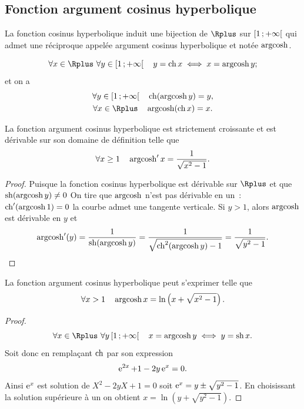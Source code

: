 \subsection{Fonction argument cosinus hyperbolique}
\label{subsec:chap1-fonctionargcosh}
\begin{defdef}
  La fonction cosinus hyperbolique induit une bijection de $\Rplus$ sur $\left[ 1 \, ;  +\infty \right[$ qui admet une réciproque appelée argument cosinus hyperbolique et notée $\operatorname{argcosh}$.
\end{defdef}
%
\begin{prop}
  \begin{equation} 
    \forall x \in \Rplus \ \forall y \in \intervallefo{1}{+\infty} \quad y=\hcos x \iff x = \argch y ;
  \end{equation}
  et on a
  \begin{gather}
    \forall y \in \intervallefo{1}{+\infty} \quad \hcos(\argch y) = y, \\
    \forall x \in \Rplus \quad \argch(\hcos x) = x.
  \end{gather}
\end{prop}
%
\begin{prop} 
  La fonction argument cosinus hyperbolique est strictement croissante et est dérivable sur son domaine de définition telle que 
  \begin{equation} 
    \forall x\geq{}1 \quad \operatorname{argcosh}' x =\frac{1}{\sqrt{x^2-1}}.
  \end{equation} 
\end{prop}
\begin{proof} 
  Puisque la fonction cosinus hyperbolique est dérivable sur $\Rplus$ et que $\operatorname{sh}(\operatorname{argcosh} y) \neq 0$ On tire que $\operatorname{argcosh}$ n'est pas dérivable en un~: $\operatorname{ch}'(\operatorname{argcosh} 1)=0$ la courbe admet une tangente verticale. Si $y>1$, alors $\operatorname{argcosh}$ est dérivable en $y$ et 
  \begin{equation} 
    \operatorname{argcosh}'(y)=\frac{1}{\operatorname{sh}(\operatorname{argcosh} y)}=\frac{1}{\sqrt{\operatorname{ch}^2(\operatorname{argcosh} y)-1}}=\frac{1}{\sqrt{y^2-1}}.
  \end{equation} 
\end{proof}
%
\begin{prop} La fonction argument cosinus hyperbolique peut s'exprimer telle que
  \begin{equation} 
    \forall x>1 \quad \operatorname{argcosh} x = \ln \left(x +\sqrt{x^2-1}\right).
  \end{equation}
\end{prop} 
\begin{proof} 
  \begin{equation}
    \forall x \in \Rplus \ \forall y \intervallefo{1}{+\infty} \quad x=\argch y \iff y=\hsin x.
  \end{equation}
  Soit donc en remplaçant $\operatorname{ch}$ par son expression
  \begin{equation} 
    \operatorname{e}^{2x} +1 - 2y\operatorname{e}^x =0.
  \end{equation}
  Ainsi $\operatorname{e}^x$ est solution de $X^2-2yX+1=0$ soit $\operatorname{e}^x = y \pm \sqrt{y^2-1}$. En choisissant la solution supérieure à un on obtient $x=\ln \left(y+\sqrt{y^2-1} \right)$.
\end{proof}

